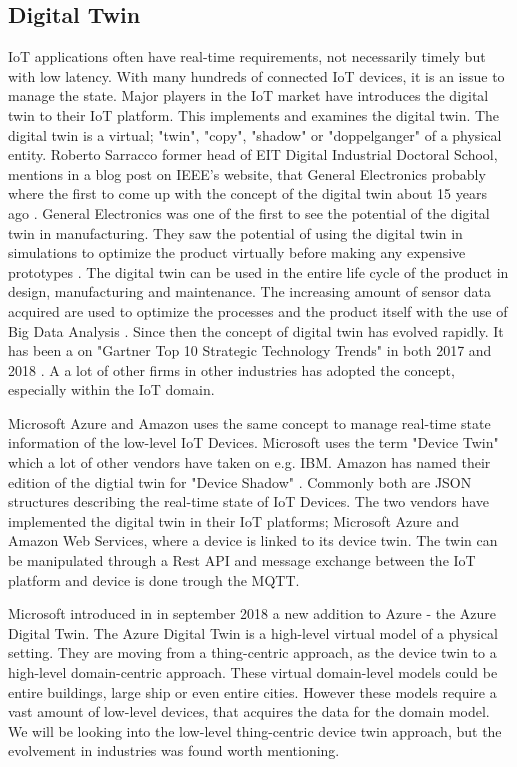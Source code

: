 \subsection{Digital Twin}
IoT applications often have real-time requirements, not necessarily timely but with low latency. With many hundreds of connected IoT devices, it is an issue to manage the state. Major players in the IoT market have introduces the digital twin to their IoT platform. This implements and examines the digital twin. The digital twin is a virtual; "twin", "copy", "shadow" or "doppelganger" of a physical entity. Roberto Sarracco former head of EIT Digital Industrial Doctoral School, mentions in a blog post on IEEE's website, that General Electronics probably where the first to come up with the concept of the digital twin about 15 years ago \cite{IEEE}.
General Electronics was one of the first to see the potential of the digital twin in manufacturing. They saw the potential of using the digital twin in simulations to optimize the product virtually before making any expensive prototypes \cite{GE}. The digital twin can be used in the entire life cycle of the product in design, manufacturing and maintenance. The increasing amount of sensor data acquired are used to optimize the processes and the product itself with the use of Big Data Analysis \cite{8477101}. Since then the concept of digital twin has evolved rapidly. It has been a on "Gartner Top 10 Strategic Technology Trends" in both 2017 and 2018 \cite{Gartner}. A a lot of other firms in other industries has adopted the concept, especially within the IoT domain.

Microsoft Azure and Amazon uses the same concept to manage real-time state information of the low-level IoT Devices. Microsoft uses the term "Device Twin" \cite{MS} which a lot of other vendors have taken on e.g. IBM. Amazon has named their edition of the digtial twin for "Device Shadow" \cite{Amazon}. Commonly both are JSON structures describing the real-time state of IoT Devices. The two vendors have implemented the digital twin in their IoT platforms; Microsoft Azure and Amazon Web Services, where a device is linked to its device twin. The twin can be manipulated through a Rest API and message exchange between the IoT platform and device is done trough the MQTT.

Microsoft introduced in \cite{azuredigitaltwin} in september 2018 a new addition to Azure - the Azure Digital Twin. The Azure Digital Twin is a high-level virtual model of a physical setting. They are moving from a thing-centric approach, as the device twin to a high-level domain-centric approach. These virtual domain-level models could be entire buildings, large ship or even entire cities. However these models require a vast amount of low-level devices, that acquires the data for the domain model. We will be looking into the low-level thing-centric device twin approach, but the evolvement in industries was found worth mentioning. 